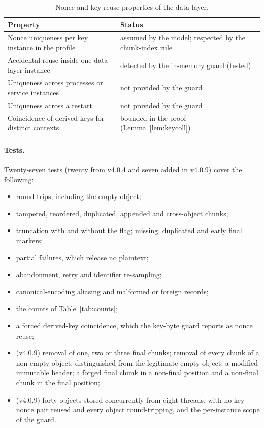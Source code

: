 \documentclass[pdflatex,sn-mathphys-num,twocolumn]{sn-jnl}
\theoremstyle{plain}
\theoremstyle{definition}
\begin{document}
\begin{table}[htbp]
\caption{Nonce and key-reuse properties of the data layer.}\label{tab:nonce}
\centering\footnotesize
\begin{tabularx}{\linewidth}{@{}>{\raggedright\arraybackslash}p{.46\linewidth}Y@{}}\toprule
Property & Status\\\midrule
Nonce uniqueness per key instance in the profile & assumed by the model; respected by the chunk-index rule\\
Accidental reuse inside one data-layer instance & detected by the in-memory guard (tested)\\
Uniqueness across processes or service instances & not provided by the guard\\
Uniqueness across a restart & not provided by the guard\\
Coincidence of derived keys for distinct contexts & bounded in the proof (Lemma~\ref{lem:keycoll})\\\bottomrule
\end{tabularx}
\end{table}

\paragraph{Tests.}
Twenty-seven tests (twenty from v4.0.4 and seven added in v4.0.9) cover the following:
\begin{itemize}
\item round trips, including the empty object;
\item tampered, reordered, duplicated, appended and cross-object chunks;
\item truncation with and without the flag; missing, duplicated and early final markers;
\item partial failures, which release no plaintext;
\item abandonment, retry and identifier re-sampling;
\item canonical-encoding aliasing and malformed or foreign records;
\item the counts of Table~\ref{tab:counts};
\item a forced derived-key coincidence, which the key-byte guard reports as nonce reuse;
\item (v4.0.9) removal of one, two or three final chunks; removal of every chunk of a non-empty object, distinguished from the legitimate empty object; a modified immutable header; a forged final chunk in a non-final position and a non-final chunk in the final position;
\item (v4.0.9) forty objects stored concurrently from eight threads, with no key-nonce pair reused and every object round-tripping, and the per-instance scope of the guard.
\end{itemize}
\end{document}
